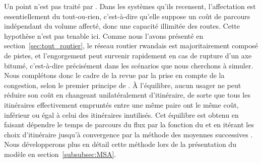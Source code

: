 \documentclass[12pt,a4paper,french]{report}
\begin{document}
	Un point n'est pas traité par \cite{deJong2004}. Dans les systèmes qu'ils recensent, l'affectation est essentiellement du tout-ou-rien, c'est-à-dire qu'elle suppose un coût de parcours indépendant du volume affecté, donc une capacité illimitée des routes. Cette hypothèse n'est pas tenable ici. Comme nous l'avons présenté en section~\ref{sec:tout_routier}, le réseau routier rwandais est majoritairement composé de pistes, et l'engorgement peut survenir rapidement en cas de rupture d'un axe bitumé, c'est-à-dire précisément dans les scénarios que nous cherchons à simuler. Nous complétons donc le cadre de la revue par la prise en compte de la congestion, selon le premier principe de \cite{Wardrop1952}. À l'équilibre, aucun usager ne peut réduire son coût en changeant unilatéralement d'itinéraire, de sorte que tous les itinéraires effectivement empruntés entre une même paire ont le même coût, inférieur ou égal à celui des itinéraires inutilisés. Cet équilibre est obtenu en faisant dépendre le temps de parcours du flux par la fonction du \cite{BPR1964} et en itérant les choix d'itinéraire jusqu'à convergence par la méthode des moyennes successives \cite{Sheffi1985}. Nous développerons plus en détail cette méthode lors de la présentation du modèle en section~\ref{subsubsec:MSA}.
	
		\newpage
	
\end{document}
